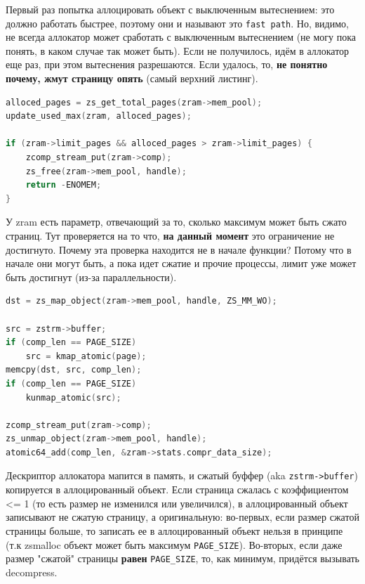 \documentclass[12pt]{report}
\begin{document}
Первый раз попытка аллоцировать объект с выключенным вытеснением: это должно работать быстрее, поэтому они и называют это \texttt{fast path}. Но, видимо, не всегда аллокатор может сработать с выключенным вытеснением (не могу пока понять, в каком случае так может быть). Если не получилось, идём в аллокатор еще раз, при этом вытеснения разрешаются. Если удалось, то, \textbf{не понятно почему, жмут страницу опять} (самый верхний листинг).\\

\begin{lstlisting}[language=c]
alloced_pages = zs_get_total_pages(zram->mem_pool);
update_used_max(zram, alloced_pages);

if (zram->limit_pages && alloced_pages > zram->limit_pages) {
	zcomp_stream_put(zram->comp);
	zs_free(zram->mem_pool, handle);
	return -ENOMEM;
}
\end{lstlisting}

У zram есть параметр, отвечающий за то, сколько максимум может быть сжато страниц. Тут проверяется на то что, \textbf{на данный момент} это ограничение не достигнуто. Почему эта проверка находится не в начале функции? Потому что в начале они могут быть, а пока идет сжатие и прочие процессы, лимит уже может быть достигнут (из-за параллельности).\\

\begin{lstlisting}[language=c]
dst = zs_map_object(zram->mem_pool, handle, ZS_MM_WO);

src = zstrm->buffer;
if (comp_len == PAGE_SIZE)
	src = kmap_atomic(page);
memcpy(dst, src, comp_len);
if (comp_len == PAGE_SIZE)
	kunmap_atomic(src);

zcomp_stream_put(zram->comp);
zs_unmap_object(zram->mem_pool, handle);
atomic64_add(comp_len, &zram->stats.compr_data_size);
\end{lstlisting}

Дескриптор аллокатора мапится в память, и сжатый буффер (aka \texttt{zstrm->buffer}) копируется в аллоцированный объект. Если страница сжалась с коэффициентом <= 1 (то есть размер не изменился или увеличился), в аллоцированный объект записывают не сжатую страницу, а оригинальную: во-первых, если размер сжатой страницы больше, то записать ее в аллоцированный объект нельзя в принципе (т.к zsmalloc объект может быть максимум \texttt{PAGE\_SIZE}). Во-вторых, если даже размер "сжатой" страницы \textbf{равен} \texttt{PAGE\_SIZE}, то, как минимум, придётся вызывать decompress.\\
\end{document}
